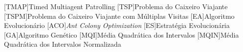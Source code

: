 \begin{acronym}[ACRONYM] 
[TMAP]{Timed Multiagent Patrolling}
[TSP]{Problema do Caixeiro Viajante}
[TSPM]{Problema do Caixeiro Viajante com Múltiplas Visitas}
[EA]{Algoritmo Evolucionário}
[ACO]{\textit{Ant Colony Optimization}}
[ES]{Estratégia Evolucionária}
[GA]{Algoritmo Genético}
[MQI]{Média Quadrática dos Intervalos}
[MQIN]{Média Quadrática dos Intervalos Normalizada}
\end{acronym}